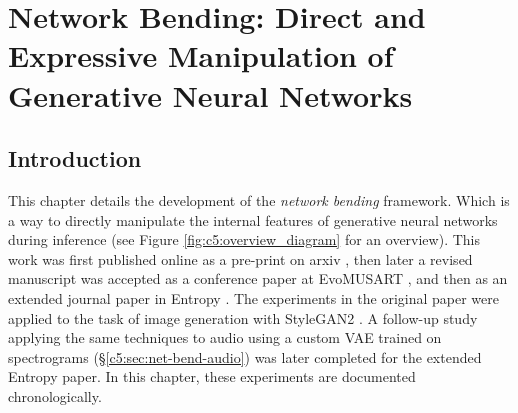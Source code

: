 \chapter{Network Bending: Direct and Expressive Manipulation of Generative Neural Networks}
\label{ch:net_bend}

\section{Introduction}

This chapter details the development of the \textit{network bending} framework. Which is a way to directly manipulate the internal features of generative neural networks during inference (see Figure \ref{fig:c5:overview_diagram} for an overview). This work was first published online as a pre-print on arxiv \citep{broad2020network}, then later a revised manuscript was accepted as a conference paper at EvoMUSART \citep{broad2021network}, and then as an extended journal paper in Entropy \citep{broad2022network}.
The experiments in the original paper were applied to the task of image generation with StyleGAN2 \citep{karras2019analyzing}. 
A follow-up study applying the same techniques to audio using a custom VAE trained on spectrograms (\S \ref{c5:sec:net-bend-audio}) was later completed for the extended Entropy paper. 
In this chapter, these experiments are documented chronologically.


